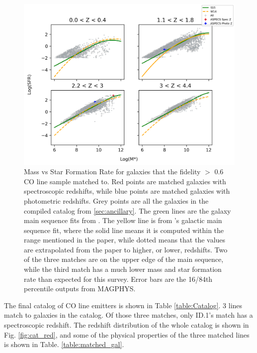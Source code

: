 \begin{figure}[!htbp]
\centering \includegraphics[width=120mm]{Survey/No_Cut_Mstar_vs_SFR_all_closest_sep_1_0_sn_fid_60.png}
\caption{Mass vs Star Formation Rate for galaxies that the fidelity $>$ 0.6 CO line sample matched to. Red points are matched galaxies with spectroscopic redshifts, while blue points are matched galaxies with photometric redshifts. Grey points are all the galaxies in the compiled catalog from \ref{sec:ancillary}. The green lines are the galaxy main sequence fits from \cite{schreiber2015herschel}. The yellow line is from \cite{Whitaker_2014}'s galactic main sequence fit, where the solid line means it is computed within the range mentioned in the paper, while dotted means that the values are extrapolated from the paper to higher, or lower, redshifts. Two of the three matches are on the upper edge of the main sequence, while the third match has a much lower mass and star formation rate than expected for this survey. Error bars are the 16/84th percentile outputs from MAGPHYS.}
\label{fig:Cross_match}
\end{figure}

The final catalog of CO line emitters is shown in Table \ref{table:Catalog}. 3 lines match to galaxies in the catalog. Of those three matches, only ID.1's match has a spectroscopic redshift. The redshift distribution of the whole catalog is shown in Fig. \ref{fig:cat_red}, and some of the physical properties of the three matched lines is shown in Table. \ref{table:matched_gal}. 

